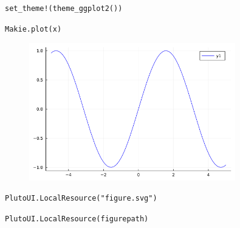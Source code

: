\begin{lstlisting}[language=JuliaLocal, style=julia]
set_theme!(theme_ggplot2())
\end{lstlisting}

\begin{lstlisting}[language=JuliaLocal, style=julia]
Makie.plot(x)
\end{lstlisting}

\begin{figure}[H]
	\centering
	\includegraphics[width=0.8\textwidth]{./figures/examplepluto_figure2.png}
	\label{fig:examplepluto_figure2.png}

\end{figure}

\begin{lstlisting}[language=JuliaLocal, style=julia]
PlutoUI.LocalResource("figure.svg")
\end{lstlisting}

\begin{lstlisting}[language=JuliaLocal, style=julia]
PlutoUI.LocalResource(figurepath)
\end{lstlisting}
